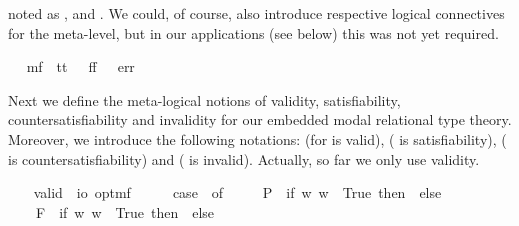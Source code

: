 \begin{isabellebody}
\begin{isamarkuptext}
  noted as \isa{{\isasymtop}}, \isa{{\isasymbottom}} and \isa{{\isacharasterisk}}. We could, of course, also introduce  
  respective logical connectives for the meta-level, but in our applications (see below)
  this was not yet required.%
\end{isamarkuptext}\isamarkuptrue%
\ \isamarkupfalse%
\ mf\ {\isacharequal}\ tt\ {\isacharparenleft}{\isachardoublequoteopen}{\isasymtop}{\isachardoublequoteclose}{\isacharparenright}\ {\isacharbar}\ ff\ {\isacharparenleft}{\isachardoublequoteopen}{\isasymbottom}{\isachardoublequoteclose}{\isacharparenright}\ {\isacharbar}\ err\ {\isacharparenleft}{\isachardoublequoteopen}{\isacharasterisk}{\isachardoublequoteclose}{\isacharparenright}%
\begin{isamarkuptext}%
Next we define the meta-logical notions of validity, satisfiability, 
  countersatisfiability and invalidity for our embedded modal relational type theory. Moreover, 
  we introduce the following notations: \isa{{\isacharbrackleft}{\isasymphi}{\isacharbrackright}} 
  (for \isa{{\isasymphi}} is valid),  (\isa{{\isasymphi}} is satisfiability),  
  (\isa{{\isasymphi}} is countersatisfiability) and  (\isa{{\isasymphi}} is invalid). Actually, so far 
  we only use validity.%
\end{isamarkuptext}\isamarkuptrue%
\ \ \isamarkupfalse%
\ valid\ {\isacharcolon}{\isacharcolon}\ {\isachardoublequoteopen}io\ opt{\isasymRightarrow}mf{\isachardoublequoteclose}\ {\isacharparenleft}{\isachardoublequoteopen}{\isacharbrackleft}{\isacharunderscore}{\isacharbrackright}{\isachardoublequoteclose}\ {\isacharbrackleft}{}{\isacharbrackright}{\isacharparenright}\ \ {\isachardoublequoteopen}{\isacharbrackleft}{\isasymphi}{\isacharbrackright}\ {\isasymequiv}\ case\ {\isasymphi}\ of\ \isanewline
\ \ \ \ P{\isacharparenleft}{\isasympsi}{\isacharparenright}\ {\isasymRightarrow}\ if\ {\isasymforall}w{\isachardot}{\isacharparenleft}{\isasympsi}\ w{\isacharparenright}\ {\isasymlongleftrightarrow}\ True\ then\ {\isasymtop}\ else\ {\isasymbottom}\ {\isacharbar}\ \isanewline
\ \ \ \ F{\isacharparenleft}{\isasympsi}{\isacharparenright}\ {\isasymRightarrow}\ if\ {\isasymforall}w{\isachardot}{\isacharparenleft}{\isasympsi}\ w{\isacharparenright}\ {\isasymlongleftrightarrow}\ True\ then\ {\isasymtop}\ else\ {\isasymbottom}\ {\isacharbar}\ \isanewline

\end{isabellebody}
